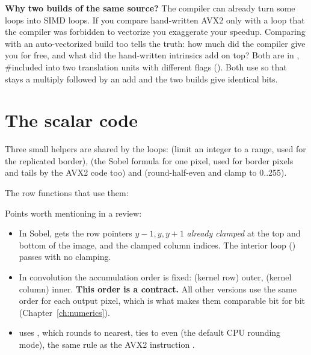 \begin{plain}
\textbf{Why two builds of the same source?} The compiler can already turn some loops into SIMD loops. If you compare hand-written AVX2 only with a loop that the compiler was forbidden to vectorize you exaggerate your speedup. Comparing with an auto-vectorized build too tells the truth: how much did the compiler give you for free, and what did the hand-written intrinsics add on top? Both are in , \#included into two translation units with different flags (). Both use  so that  stays a multiply followed by an add and the two builds give identical bits.
\end{plain}

\section{The scalar code}

Three small helpers are shared by the loops:  (limit an integer to a range, used for the replicated border),  (the Sobel formula for one pixel, used for border pixels and tails by the AVX2 code too) and  (round-half-even and clamp to 0..255).



The row functions that use them:





Points worth mentioning in a review:
\begin{itemize}
\item In Sobel,  gets the row pointers $y-1,y,y+1$ \emph{already clamped} at the top and bottom of the image, and the clamped column indices. The interior loop () passes  with no clamping.
\item In convolution the accumulation order is fixed:  (kernel row) outer,  (kernel column) inner. \textbf{This order is a contract.} All other versions use the same order for each output pixel, which is what makes them comparable bit for bit (Chapter~\ref{ch:numerics}).
\item {} uses , which rounds to nearest, ties to even (the default CPU rounding mode), the same rule as the AVX2 instruction .
\end{itemize}

